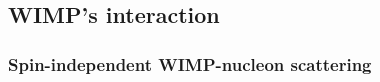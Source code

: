 \subsection{WIMP's interaction} \label{sec:wimp}

\subsubsection{Spin-independent WIMP-nucleon scattering}


\clearpage
